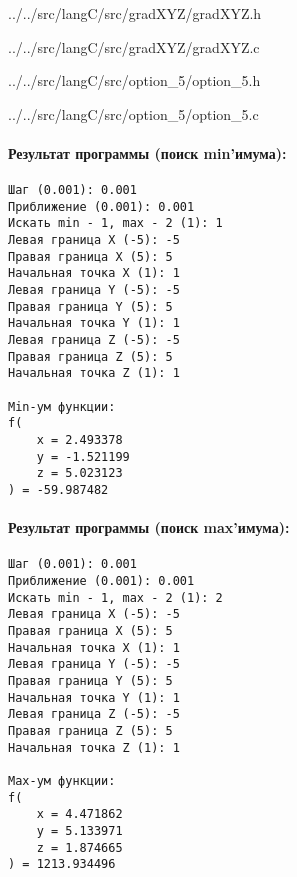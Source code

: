 
{../../src/langC/src/gradXYZ/gradXYZ.h}


{../../src/langC/src/gradXYZ/gradXYZ.c}



{../../src/langC/src/option_5/option_5.h}


{../../src/langC/src/option_5/option_5.c}


\paragraph{Результат программы (поиск min'имума):} \hspace{0pt}

\begin{lstlisting}[language=Out,]
Шаг (0.001): 0.001
Приближение (0.001): 0.001 
Искать min - 1, max - 2 (1): 1
Левая граница X (-5): -5
Правая граница X (5): 5
Начальная точка X (1): 1
Левая граница Y (-5): -5
Правая граница Y (5): 5
Начальная точка Y (1): 1
Левая граница Z (-5): -5
Правая граница Z (5): 5
Начальная точка Z (1): 1

Min-ум функции:
f(
    x = 2.493378
    y = -1.521199
    z = 5.023123
) = -59.987482
\end{lstlisting}


\paragraph{Результат программы (поиск max'имума):} \hspace{0pt}

\begin{lstlisting}[language=Out,]
Шаг (0.001): 0.001
Приближение (0.001): 0.001
Искать min - 1, max - 2 (1): 2
Левая граница X (-5): -5
Правая граница X (5): 5
Начальная точка X (1): 1
Левая граница Y (-5): -5
Правая граница Y (5): 5
Начальная точка Y (1): 1
Левая граница Z (-5): -5
Правая граница Z (5): 5
Начальная точка Z (1): 1

Max-ум функции:
f(
    x = 4.471862
    y = 5.133971
    z = 1.874665
) = 1213.934496    
\end{lstlisting}